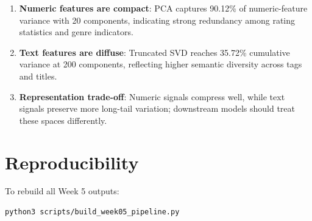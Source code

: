 \documentclass[11pt]{article}
\begin{document}
\begin{enumerate}[leftmargin=1.5em]
    \item \textbf{Numeric features are compact}: PCA captures 90.12\% of numeric-feature variance with 20 components, indicating strong redundancy among rating statistics and genre indicators.
    \item \textbf{Text features are diffuse}: Truncated SVD reaches 35.72\% cumulative variance at 200 components, reflecting higher semantic diversity across tags and titles.
    \item \textbf{Representation trade-off}: Numeric signals compress well, while text signals preserve more long-tail variation; downstream models should treat these spaces differently.
\end{enumerate}

\section{Reproducibility}

To rebuild all Week 5 outputs:

\begin{verbatim}
python3 scripts/build_week05_pipeline.py
\end{verbatim}
\end{document}
